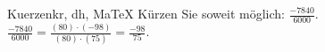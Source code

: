 \begin{MAufgabe}{Kuerzen}{kr, dh, MaTeX}
K\"urzen Sie soweit m\"oglich: $\frac{-7840}{6000}$.\\ 
\ifLsg\MLoesung
\quad $\frac{-7840}{6000}=\frac{(80)\cdot(-98)}{(80)\cdot(75)}=\frac{-98}{75}$.\else\relax\fi
 \end{MAufgabe}